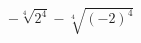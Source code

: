 \begin{ex}[type=calculate]
	\begin{condition}
		\( -\sqrt[4]{2^4}-\sqrt[4]{(-2)^4} \)
	\end{condition}
\end{ex}